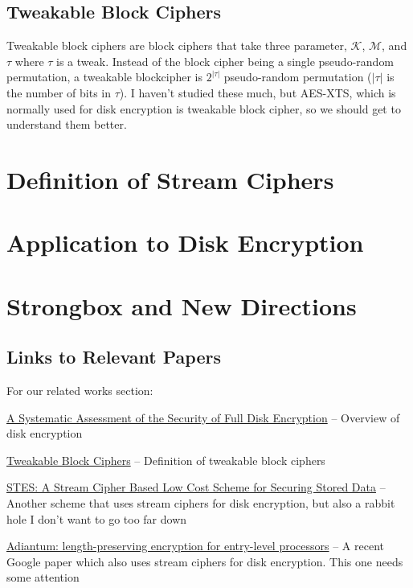 \documentclass[11pt]{article}
\newcommand{\msgs}{\mathcal{M}}
\newcommand{\keys}{\mathcal{K}}
\begin{document}
	\subsection{Tweakable Block Ciphers}
	
	Tweakable block ciphers are block ciphers that take three parameter, $\keys$, $\msgs$, and $\tau$ where $\tau$ is a tweak. Instead of the block cipher being a single pseudo-random permutation, a tweakable blockcipher is $2^{|\tau|}$ pseudo-random permutation ($|\tau|$ is the number of bits in $\tau$). I haven't studied these much, but AES-XTS, which is normally used for disk encryption is tweakable block cipher, so we should get to understand them better.
	
	\section{Definition of Stream Ciphers}
	
	
	\section{Application to Disk Encryption}

	\section{Strongbox and New Directions}
	
	\subsection{Links to Relevant Papers}
	
	For our related works section:
	
	\begin{description}[font=$\bullet$~\normalfont\scshape\color{red!50!black}]
		\item \href{https://ieeexplore.ieee.org/abstract/document/6951337}{A Systematic Assessment of the Security of Full Disk Encryption} -- Overview of disk encryption
		\item \href{https://people.eecs.berkeley.edu/~daw/papers/tweak-joc.pdf}{Tweakable Block Ciphers} -- Definition of tweakable block ciphers
		\item \href{https://ieeexplore.ieee.org/abstract/document/6945842}{STES: A Stream Cipher Based Low Cost Scheme for Securing Stored Data} -- Another scheme that uses stream ciphers for disk encryption, but also a rabbit hole I don't want to go too far down
		\item \href{https://eprint.iacr.org/2018/720}{Adiantum: length-preserving encryption for
			entry-level processors} -- A recent Google paper which also uses stream ciphers for disk encryption. This one needs some attention
		\item \href{}{}
	\end{description}
	
	
	
\end{document}
